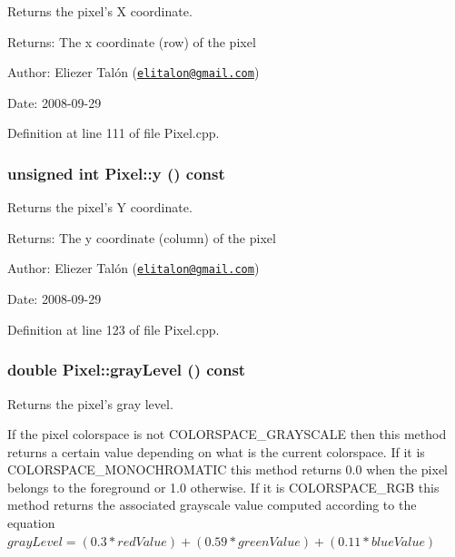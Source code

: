 Returns the pixel's X coordinate. 

\begin{Desc}
\item[Returns:]The x coordinate (row) of the pixel\end{Desc}
\begin{Desc}
\item[Author:]Eliezer Talón (\href{mailto:elitalon@gmail.com}{\tt elitalon@gmail.com}) \end{Desc}
\begin{Desc}
\item[Date:]2008-09-29 \end{Desc}


Definition at line 111 of file Pixel.cpp.\hypertarget{class_pixel_204cc91a99e1e4f1d96c9cf6caf5747a}{
\subsubsection[y]{\setlength{\rightskip}{0pt plus 5cm}unsigned int Pixel::y () const}}
\label{class_pixel_204cc91a99e1e4f1d96c9cf6caf5747a}


Returns the pixel's Y coordinate. 

\begin{Desc}
\item[Returns:]The y coordinate (column) of the pixel\end{Desc}
\begin{Desc}
\item[Author:]Eliezer Talón (\href{mailto:elitalon@gmail.com}{\tt elitalon@gmail.com}) \end{Desc}
\begin{Desc}
\item[Date:]2008-09-29 \end{Desc}


Definition at line 123 of file Pixel.cpp.\hypertarget{class_pixel_6e445cee8bfa4475238823e0b6da42b0}{
\subsubsection[grayLevel]{\setlength{\rightskip}{0pt plus 5cm}double Pixel::grayLevel () const}}
\label{class_pixel_6e445cee8bfa4475238823e0b6da42b0}


Returns the pixel's gray level. 

If the pixel colorspace is not COLORSPACE\_\-GRAYSCALE then this method returns a certain value depending on what is the current colorspace. If it is COLORSPACE\_\-MONOCHROMATIC this method returns 0.0 when the pixel belongs to the foreground or 1.0 otherwise. If it is COLORSPACE\_\-RGB this method returns the associated grayscale value computed according to the equation $grayLevel = (0.3 * redValue) + (0.59 * greenValue) + (0.11 * blueValue)$

